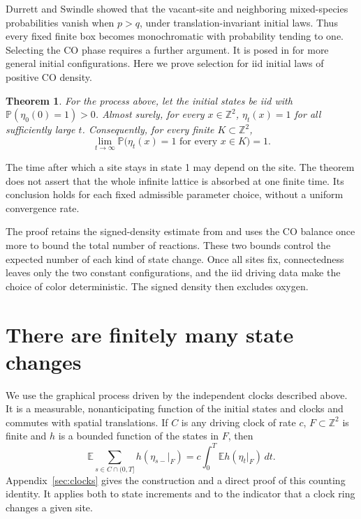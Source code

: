 \documentclass[11pt,a4paper]{article}
\newtheorem{theorem}{Theorem}
\newcommand{\Prob}{\mathbb P}
\newcommand{\E}{\mathbb E}
\newcommand{\Z}{\mathbb Z}
\begin{document}
Durrett and Swindle \cite[Theorem~1 and its proof, pp.~490--492]{DS}
showed that the vacant-site and neighboring mixed-species probabilities
vanish when \(p>q\), under translation-invariant initial laws. Thus every
fixed finite box becomes monochromatic with probability tending to one.
Selecting the CO phase requires a further argument. It is posed in
\cite[Section~5.4, Open Problem~5.4.6]{IPS} for more general initial
configurations. Here we prove selection for iid initial laws of positive
CO density.

\begin{theorem}\label{thm:selection}
For the process above, let the initial states be iid with
\(\Prob(\eta_0(0)=1)>0\). Almost surely, for every \(x\in\Z^2\),
\(\eta_t(x)=1\) for all sufficiently large \(t\). Consequently, for every
finite \(K\subset\Z^2\),
\begin{equation}\label{eq:target}
 \lim_{t\to\infty}
 \Prob\bigl(\eta_t(x)=1\text{ for every }x\in K\bigr)=1.
\end{equation}
\end{theorem}

The time after which a site stays in state 1 may depend on the site.
The theorem does not assert that the whole infinite lattice is absorbed
at one finite time. Its conclusion holds for each fixed admissible
parameter choice, without a uniform convergence rate.

The proof retains the signed-density estimate from \cite{DS} and uses
the CO balance once more to bound the total number of reactions.
These two bounds control the expected number of each kind of state change.
Once all sites fix, connectedness leaves only the two constant configurations, and
the iid driving data make the choice of color deterministic. The
signed density then excludes oxygen.

\section{There are finitely many state changes}

We use the graphical process driven by the independent clocks described
above. It is a measurable, nonanticipating function of the initial states
and clocks and commutes with spatial translations. If \(C\) is any
driving clock of rate \(c\), \(F\subset\Z^2\) is finite and \(h\) is a
bounded function of the states in \(F\), then
\begin{equation}\label{eq:counts}
 \E\sum_{s\in C\cap(0,T]}h(\eta_{s-}|_F)
       =c\int_0^T \E h(\eta_t|_F)\,dt .
\end{equation}
Appendix~\ref{sec:clocks} gives the construction and a direct proof of
this counting identity. It applies both to state increments and to the
indicator that a clock ring changes a given site.
\end{document}
